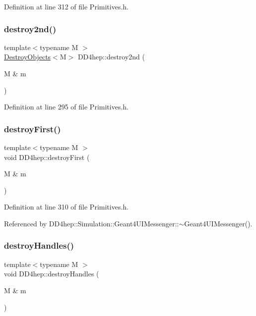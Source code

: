 Definition at line 312 of file Primitives.\+h.

\hypertarget{namespace_d_d4hep_a81661ef6868ba17c006826cace56f4aa}{}\label{namespace_d_d4hep_a81661ef6868ba17c006826cace56f4aa} 
\subsubsection{\texorpdfstring{destroy2nd()}{destroy2nd()}}
{\footnotesize\ttfamily template$<$typename M $>$ \\
\hyperlink{class_d_d4hep_1_1_destroy_objects}{Destroy\+Objects}$<$M$>$ D\+D4hep\+::destroy2nd (\begin{DoxyParamCaption}\item[{M \&}]{m }\end{DoxyParamCaption})}



Definition at line 295 of file Primitives.\+h.

\hypertarget{namespace_d_d4hep_affba2c49c016cc41716f1d6a020064bf}{}\label{namespace_d_d4hep_affba2c49c016cc41716f1d6a020064bf} 
\subsubsection{\texorpdfstring{destroy\+First()}{destroyFirst()}}
{\footnotesize\ttfamily template$<$typename M $>$ \\
void D\+D4hep\+::destroy\+First (\begin{DoxyParamCaption}\item[{M \&}]{m }\end{DoxyParamCaption})}



Definition at line 310 of file Primitives.\+h.



Referenced by D\+D4hep\+::\+Simulation\+::\+Geant4\+U\+I\+Messenger\+::$\sim$\+Geant4\+U\+I\+Messenger().

\hypertarget{namespace_d_d4hep_a1652ee4b3e9e0bc16b654029313493f9}{}\label{namespace_d_d4hep_a1652ee4b3e9e0bc16b654029313493f9} 
\subsubsection{\texorpdfstring{destroy\+Handles()}{destroyHandles()}}
{\footnotesize\ttfamily template$<$typename M $>$ \\
void D\+D4hep\+::destroy\+Handles (\begin{DoxyParamCaption}\item[{M \&}]{m }\end{DoxyParamCaption})}



